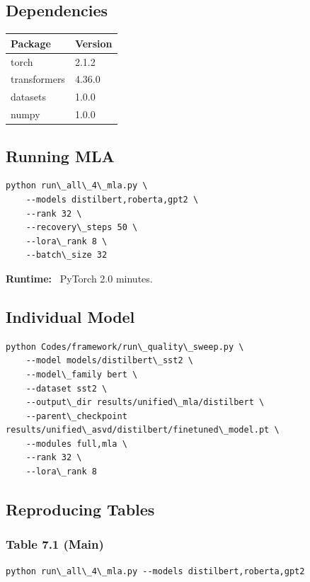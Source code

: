 \subsection{Dependencies}

\begin{table}[H]
\centering
\small
\begin{tabular}{ll}
\toprule
\textbf{Package} & \textbf{Version} \\
\midrule
torch & 2.1.2 \\
transformers & 4.36.0 \\
datasets & 1.0.0 \\
numpy & 1.0.0 \\
\bottomrule
\end{tabular}
\end{table}

\subsection{Running MLA}

\begin{lstlisting}
python run\_all\_4\_mla.py \
    --models distilbert,roberta,gpt2 \
    --rank 32 \
    --recovery\_steps 50 \
    --lora\_rank 8 \
    --batch\_size 32
\end{lstlisting}

\textbf{Runtime:} ~PyTorch 2.0 minutes.

\subsection{Individual Model}

\begin{lstlisting}
python Codes/framework/run\_quality\_sweep.py \
    --model models/distilbert\_sst2 \
    --model\_family bert \
    --dataset sst2 \
    --output\_dir results/unified\_mla/distilbert \
    --parent\_checkpoint results/unified\_asvd/distilbert/finetuned\_model.pt \
    --modules full,mla \
    --rank 32 \
    --lora\_rank 8
\end{lstlisting}

\subsection{Reproducing Tables}

\subsubsection{Table 7.1 (Main)}
\begin{lstlisting}
python run\_all\_4\_mla.py --models distilbert,roberta,gpt2
\end{lstlisting}

